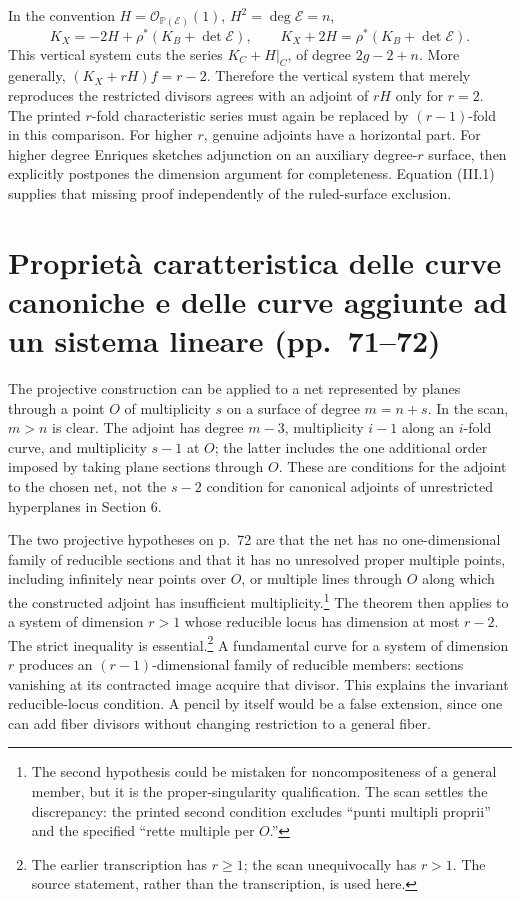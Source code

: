In the convention \(H=\mathcal O_{\mathbb{P}(\mathcal E)}(1)\), \(H^2=\deg\mathcal E=n\), \[
K_X=-2H+\rho^*(K_B+\det\mathcal E),
\qquad K_X+2H=\rho^*(K_B+\det\mathcal E).
\] This vertical system cuts the series \(K_C+H|_C\), of degree \(2g-2+n\). More generally, \((K_X+rH)f=r-2\). Therefore the vertical system that merely reproduces the restricted divisors agrees with an adjoint of \(rH\) only for \(r=2\). The printed \(r\)-fold characteristic series must again be replaced by \((r-1)\)-fold in this comparison. For higher \(r\), genuine adjoints have a horizontal part. For higher degree Enriques sketches adjunction on an auxiliary degree-\(r\) surface, then explicitly postpones the dimension argument for completeness. Equation (III.1) supplies that missing proof independently of the ruled-surface exclusion.

\section[Proprietà caratteristica degli aggiunti]{Proprietà caratteristica delle curve canoniche e delle curve aggiunte ad un sistema lineare (pp.~71--72)}\label{commentary-III-4}

The projective construction can be applied to a net represented by planes through a point \(O\) of multiplicity \(s\) on a surface of degree \(m=n+s\). In the scan, \(m>n\) is clear. The adjoint has degree \(m-3\), multiplicity \(i-1\) along an \(i\)-fold curve, and multiplicity \(s-1\) at \(O\); the latter includes the one additional order imposed by taking plane sections through \(O\). These are conditions for the adjoint to the chosen net, not the \(s-2\) condition for canonical adjoints of unrestricted hyperplanes in Section 6.

The two projective hypotheses on p.~72 are that the net has no one-dimensional family of reducible sections and that it has no unresolved proper multiple points, including infinitely near points over \(O\), or multiple lines through \(O\) along which the constructed adjoint has insufficient multiplicity.\footnote{The second hypothesis could be mistaken for noncompositeness of a general member, but it is the proper-singularity qualification. The scan settles the discrepancy: the printed second condition excludes ``punti multipli proprii'' and the specified ``rette multiple per \(O\).''} The theorem then applies to a system of dimension \(r>1\) whose reducible locus has dimension at most \(r-2\). The strict inequality is essential.\footnote{The earlier transcription has \(r\geq1\); the scan unequivocally has \(r>1\). The source statement, rather than the transcription, is used here.} A fundamental curve for a system of dimension \(r\) produces an \((r-1)\)-dimensional family of reducible members: sections vanishing at its contracted image acquire that divisor. This explains the invariant reducible-locus condition. A pencil by itself would be a false extension, since one can add fiber divisors without changing restriction to a general fiber.

